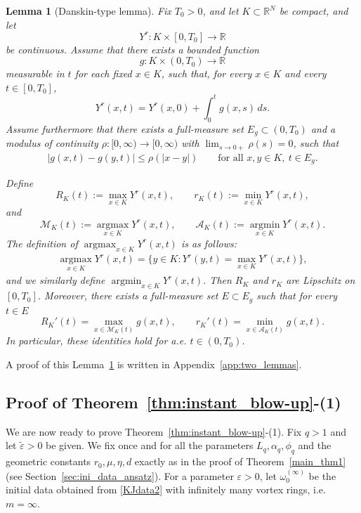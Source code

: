 \documentclass[reqno,11pt]{amsart}
\newtheorem{lemma}[theorem]{Lemma}
\begin{document}
\begin{lemma}[Danskin-type lemma]\label{lem:envelope_radial_extrema}
Fix $T_0>0$, and let $K\subset \mathbb{R}^N$ be compact, and let
\[
Y^r:K\times [0,T_0]\to \mathbb{R}
\]
be continuous. Assume that there exists a bounded function
\[
g:K\times (0,T_0)\to \mathbb{R}
\] measurable in $t$ for each fixed $x\in K$, such that, for every
$x\in K$ and every $t\in [0,T_0]$,
\[
Y^r(x,t)=Y^r(x,0)+\int_0^t g(x,s)\,ds.
\]
Assume furthermore that there exists a full-measure set $E_g\subset(0,T_0)$ and  a modulus of continuity $\rho:[0,\infty)\to [0,\infty)$  with $\lim_{s\to0+} \rho(s)=0$, such that
\begin{align}
\label{eq:mod_cont}
|g(x,t)-g(y,t)|\le \rho(|x-y|)
\qquad
\text{for all }x,y\in K,\ t\in E_g.
\end{align}

Define
\[
R_K(t):=\max_{x\in K} Y^r(x,t),
\qquad
r_K(t):=\min_{x\in K} Y^r(x,t),
\]
and
\[
\mathcal M_K(t):=\operatorname*{argmax}_{x\in K} Y^r(x,t),
\qquad
\mathcal A_K(t):=\operatorname*{argmin}_{x\in K} Y^r(x,t).
\]
The definition of $\operatorname*{argmax}_{x\in K} Y^r(x,t)$ is as follows:
    \begin{align*}
        \operatorname*{argmax}_{x\in K} Y^r(x,t)
    =
        \{y\in K: Y^r(y,t)= \max_{x\in K}Y^r(x,t)\},
    \end{align*}
and we similarly define $\operatorname{argmin}_{x\in K} Y^r(x,t)$.
Then $R_K$ and $r_K$ are Lipschitz on $[0,T_0]$. Moreover, there exists a full-measure set $E\subset E_g$ such that for every $t\in E$
\[
R_K'(t)=\max_{x\in \mathcal M_K(t)} g(x,t),
\qquad
r_K'(t)=\min_{x\in \mathcal A_K(t)} g(x,t).
\]
In particular, these identities hold for a.e. $t\in (0,T_0)$.
\end{lemma}
A proof of this Lemma~\ref{lem:envelope_radial_extrema} is written in Appendix~\ref{app:two_lemmas}.


\subsection{Proof of Theorem~\ref{thm:instant_blow-up}-(1)}
\label{subsec:non_existence}
We are now ready to prove Theorem~\ref{thm:instant_blow-up}-(1). 
Fix $q>1$ and let $\tilde\varepsilon>0$ be given. We fix once and for all the parameters
$L_q,\alpha_q,\phi_q$ and the geometric constants $r_0,\mu,\eta,d$ exactly as in the proof of
Theorem~\ref{main_thm1} (see Section~\ref{sec:ini_data_ansatz}). For a parameter $\varepsilon>0$, let $\omega_0^{(\infty)}$ be the initial data obtained from \eqref{KJdata2}
with infinitely many vortex rings, i.e. $m=\infty$.
\end{document}
